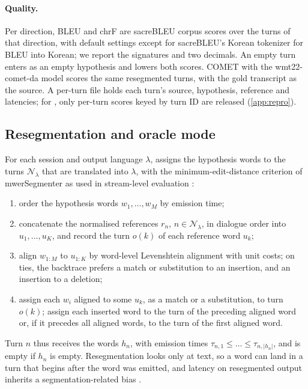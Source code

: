 \paragraph{Quality.}
Per direction, BLEU \citep{papineni2002bleu} and chrF \citep{popovic2015chrf} are sacreBLEU corpus scores \citep{post2018call} over the turns of that direction, with default settings except for sacreBLEU's Korean tokenizer for BLEU into Korean; we report the signatures and two decimals. An empty turn enters as an empty hypothesis and lowers both scores. COMET with the wmt22-comet-da model \citep{rei2020comet,rei2022comet} scores the same resegmented turns, with the gold transcript as the source. A per-turn file holds each turn's source, hypothesis, reference and latencies; for \taxi, only per-turn scores keyed by turn ID are released (\cref{app:repro}).

\subsection{Resegmentation and oracle mode}

For each session and output language $\lambda$, \scorer assigns the hypothesis words to the turns $\mathcal{N}_\lambda$ that are translated into $\lambda$, with the minimum-edit-distance criterion of mwerSegmenter \citep{matusov2005evaluating} as used in stream-level evaluation \citep{iranzosanchez2021stream,papi2024streamatt}:
\begin{enumerate}
  \item order the hypothesis words $w_1,\dots,w_M$ by emission time;
  \item concatenate the normalised references $r_n$, $n\in\mathcal{N}_\lambda$, in dialogue order into $u_1,\dots,u_K$, and record the turn $o(k)$ of each reference word $u_k$;
  \item align $w_{1:M}$ to $u_{1:K}$ by word-level Levenshtein alignment with unit costs; on ties, the backtrace prefers a match or substitution to an insertion, and an insertion to a deletion;
  \item assign each $w_i$ aligned to some $u_k$, as a match or a substitution, to turn $o(k)$; assign each inserted word to the turn of the preceding aligned word or, if it precedes all aligned words, to the turn of the first aligned word.
\end{enumerate}
Turn $n$ thus receives the words $h_n$, with emission times $\tau_{n,1}\le\dots\le\tau_{n,|h_n|}$, and is empty if $h_n$ is empty. Resegmentation looks only at text, so a word can land in a turn that begins after the word was emitted, and latency on resegmented output inherits a segmentation-related bias \citep{polak2025better}.

